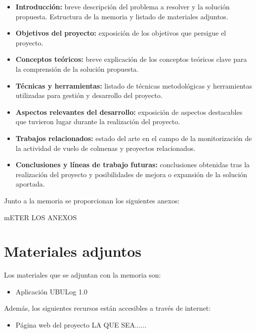 \begin{itemize}
	\tightlist
	\item
	\textbf{Introducción:} breve descripción del problema a resolver y la
	solución propuesta. Estructura de la memoria y listado de materiales
	adjuntos.
	\item
	\textbf{Objetivos del proyecto:} exposición de los objetivos que
	persigue el proyecto.
	\item
	\textbf{Conceptos teóricos:} breve explicación de los conceptos
	teóricos clave para la comprensión de la solución propuesta.
	\item
	\textbf{Técnicas y herramientas:} listado de técnicas metodológicas y
	herramientas utilizadas para gestión y desarrollo del proyecto.
	\item
	\textbf{Aspectos relevantes del desarrollo:} exposición de aspectos
	destacables que tuvieron lugar durante la realización del proyecto.
	\item
	\textbf{Trabajos relacionados:} estado del arte en el campo de la
	monitorización de la actividad de vuelo de colmenas y proyectos
	relacionados.
	\item
	\textbf{Conclusiones y líneas de trabajo futuras:} conclusiones
	obtenidas tras la realización del proyecto y posibilidades de mejora o
	expansión de la solución aportada.
\end{itemize}

Junto a la memoria se proporcionan los siguientes anexos:

mETER LOS ANEXOS

\section{Materiales adjuntos}\label{materiales-adjuntos}

Los materiales que se adjuntan con la memoria son: 

\begin{itemize}
	\tightlist
	\item
	Aplicación UBULog 1.0
\end{itemize}

Además, los siguientes recursos están accesibles a través de internet:

\begin{itemize}
	\tightlist
	\item
	Página web del proyecto LA QUE SEA......
	
\end{itemize}



